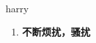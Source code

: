 
\begin{frame}
{\huge harry}
\begin{center}
\begin{enumerate}\Large
  \item \textbf{不断烦扰，骚扰}
\end{enumerate}
\end{center}
\end{frame}
